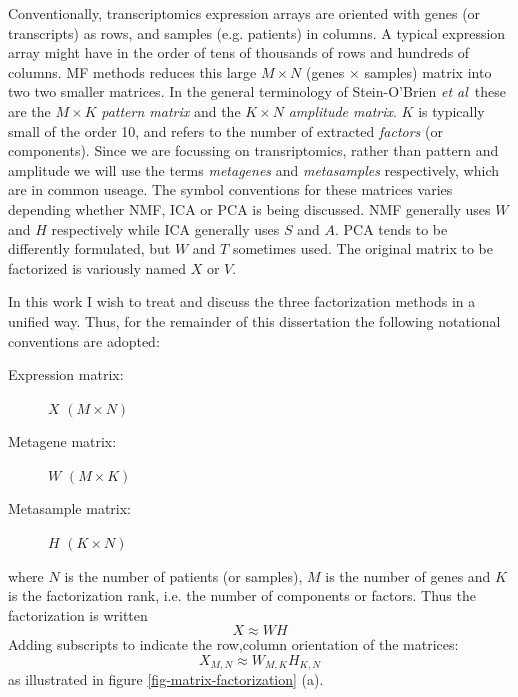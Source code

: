 \documentclass[draft, tikz, 12pt,a4paper,oneside,fleqn]{article}
\newcommand{\etal}{{\em et al\/}}
\begin{document}
Conventionally, transcriptomics expression arrays are oriented with genes (or transcripts) as rows, and samples (e.g. patients) in columns.   
A typical expression array might have in the order of tens of thousands of rows and hundreds of columns.  
MF methods reduces this large $M \times N$ (genes $\times$ samples) matrix into two two smaller matrices.
In the general terminology of Stein-O'Brien \etal\ these are the $M \times K$ \emph{pattern matrix} and the $K \times N$ \emph{amplitude matrix}.  $K$ is typically small of the order 10, and refers to the number of extracted \emph{factors} (or components). 
Since we are focussing on transriptomics, rather than pattern and amplitude we will use the terms \emph{metagenes} and \emph{metasamples} respectively, which are in common useage.  The symbol conventions for these matrices varies depending whether NMF, ICA or PCA is being discussed.   NMF generally uses $W$ and $H$ respectively while ICA generally uses $S$ and $A$.  PCA tends to be differently formulated, but $W$ and $T$ sometimes used.   The original matrix to be factorized is variously named $X$ or $V$.

In this work I wish to treat and discuss the three factorization methods in a unified way.  Thus, for the remainder of this dissertation the following notational conventions are adopted:
\begin{description}
\item[Expression matrix:] $X$ $(M \times N)$
\item[Metagene matrix:] $W$ $(M \times K)$
\item[Metasample matrix:] $H$ $(K \times N)$
\end{description}
where $N$ is the number of patients (or samples), $M$ is the number of genes and $K$ is the factorization rank, i.e. the number of components or factors.  Thus the factorization is written
\begin{equation}
X \approx W H
\end{equation}
Adding subscripts to indicate the row,column orientation of the matrices:
\begin{equation}
X_{M,N} \approx W_{M,K} H_{K,N}
\end{equation}
as illustrated in figure \ref{fig-matrix-factorization} (a).
\end{document}
